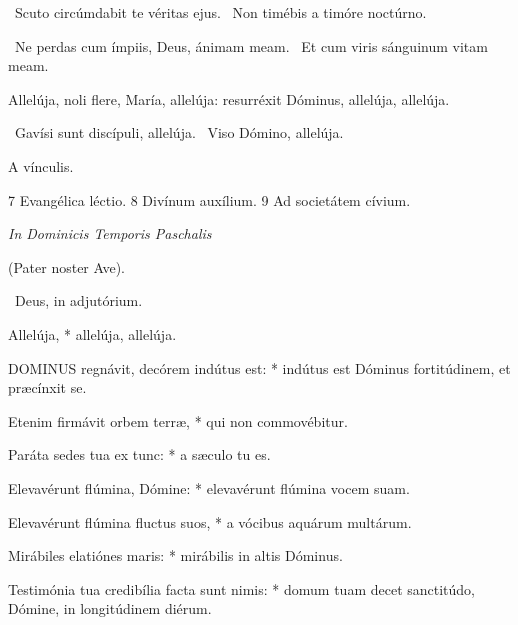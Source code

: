 \V\ Scuto circúmdabit te véritas ejus. \R\ Non timébis a timóre noctúrno.


\V\ Ne perdas cum ímpiis, Deus, ánimam meam. \R\ Et cum viris sánguinum vitam meam.


 Allelúja, noli flere, María, allelúja: resurréxit Dóminus, allelúja, allelúja.

\V\ Gavísi sunt discípuli, allelúja. \R\ Viso Dómino, allelúja.

 A vínculis.

 7 Evangélica léctio. 8 Divínum auxílium. 9 Ad societátem cívium.



\textit{In Dominicis Temporis Paschalis}

(Pater noster  Ave).

\V\ Deus, in adjutórium.

 Allelúja, * allelúja, allelúja.




\lettrine[lines=2]{D}{OMINUS} regnávit, decórem indútus est: * indútus est Dóminus fortitúdinem, et præcínxit se.

Etenim firmávit orbem terræ, * qui non commovébitur.

Paráta sedes tua ex tunc: * a sæculo tu es.

Elevavérunt flúmina, Dómine: * elevavérunt flúmina vocem suam.

Elevavérunt flúmina fluctus suos, * a vócibus aquárum multárum.

Mirábiles elatiónes maris: * mirábilis in altis Dóminus.

Testimónia tua credibília facta sunt nimis: * domum tuam decet sanctitúdo, Dómine, in longitúdinem diérum.

